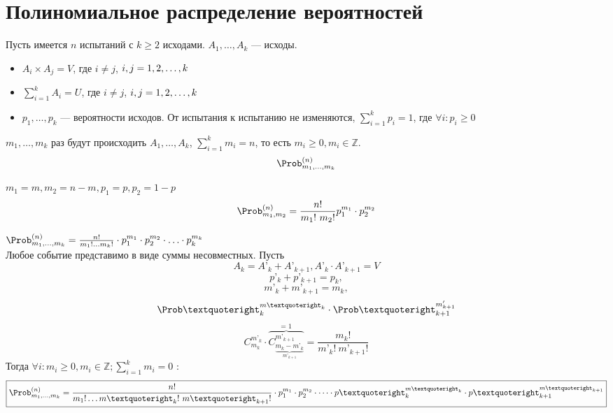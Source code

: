 \section{Полиномиальное распределение вероятностей}
Пусть имеется $n$ испытаний с $k \geqslant 2$ исходами. $A_1, \dots, A_k$ --- исходы.
\begin{itemize}
	\item $A_i \times A_j = V$, где $i \not = j$, $i, j = 1,2,\dots,k$
	\item $\sum\limits_{i=1}^k A_i = U$, где $i \not = j$, $i, j = 1,2,\dots,k$
	\item $p_1, \dots, p_k$ --- вероятности исходов. От испытания к испытанию не изменяются, $\sum\limits_{i=1}^k p_i = 1$, где $\forall i: p_i \geq 0$
\end{itemize}
$m_1, \dots, m_k$ раз будут происходить $A_1, \dots, A_k$, $\sum\limits_{i=1}^k m_i = n$, то есть $m_i \geq 0, m_i \in \mathbb{Z}$. \\
\[ \Prob_{m_1, \dots, m_k}^{(n)} \]
\begin{description}[leftmargin=0cm]
	\item[$k = 2, \Prob_{m_1, m_2}^{(n)}:$] $m_1 = m, m_2 = n-m, p_1 = p, p_2 = 1-p$
	      \[
		      \Prob_{m_1, m_2}^{(n)} = \frac{n!}{m_1 !\ m_2 !} p_1^{m_1} \cdot p_2^{m_2}
	      \]
	\item[$k \ge 2:$] $\Prob_{m_1, \ldots, m_k}^{(n)} = \frac{n!}{m_1 ! \ldots m_k !} \cdot p_1^{m_1} \cdot p_2^{m_2} \cdot \ldots \cdot p_k^{m_k}$ \\
	      Любое событие представимо в виде суммы несовместных. Пусть
		  \[ A_k = A’_k + A’_{k+1}, A’_k \cdot A’_{k+1} = V \]
		  \[ p’_k + p’_{k+1} = p_k, \]
		  \[ m’_k + m’_{k+1} = m_k, \]
		  \[ {\Prob’}_{k}^{m’_{k}} \cdot {\Prob’}_{k+1}^{m'_{k+1}} \]
	      \[ C_{m_k}^{{m’}_k} \cdot \overbrace{ C_{\underbrace{{m_k - {m’}_k}}_{{m’}_{k+1}}}^{{m’}_{k+1}} }^{\text{= 1}} = \frac{m_k !}{{m’}_k !\ {m’}_{k+1} !} \]
	      Тогда $ \forall i : m_i \geqslant 0, m_i \in \mathbb{Z};  \sum\limits_{i=1}^k m_i = 0$ :
	      \[
		      \boxed{\Prob_{m_1, \dots, m_k}^{(n)} = \frac{n!}{{m}_1 ! \ldots {m’}_k !\ {m’}_{k+1} !} \cdot p_1^{m_1} \cdot p_2^{m_2} \cdot \dots \cdot {p’}_k^{{m’}_k} \cdot {p’}_{k+1}^{{m’}_{k+1}}}
	      \]
\end{description}

